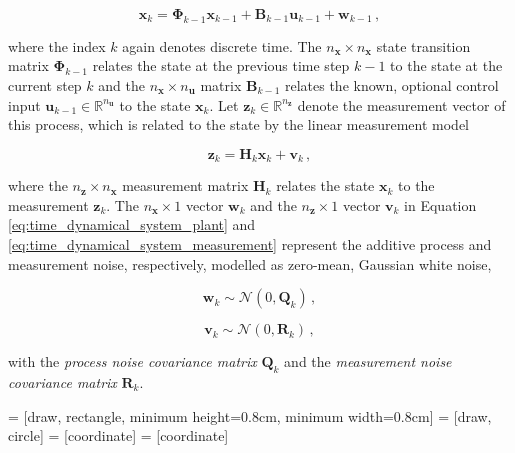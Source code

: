 \begin{equation}\label{eq:time_dynamical_system_plant}
  \bm{x}_k = \bm{\Phi}_{k-1}\bm{x}_{k-1}+\bm{B}_{k-1}\bm{u}_{k-1}+\bm{w}_{k-1}\,,
\end{equation}

\noindent
where the index $k$ again denotes discrete time. The $n_{\bm{x}} \times n_{\bm{x}}$ state transition matrix $\bm{\Phi}_{k-1}$ relates the state at the previous time step $k-1$ to the state at the current step $k$ and the $n_{\bm{x}} \times n_{\bm{u}}$ matrix $\bm{B}_{k-1}$ relates the known, optional control input $\bm{u}_{k-1} \in \mathbb{R}^{n_{\bm{u}}}$ to the state $\bm{x}_k$. Let $\bm{z}_k \in \mathbb{R}^{n_{\bm{z}}}$ denote the measurement vector of this process, which is related to the state by the linear measurement model

\begin{equation}\label{eq:time_dynamical_system_measurement}
  \bm{z}_k = \bm{H}_{k}\bm{x}_{k}+\bm{v}_{k}\,,
\end{equation}

\noindent
 where the $n_{\bm{z}} \times n_{\bm{x}}$ measurement matrix $\bm{H}_{k}$ relates the state $\bm{x}_k$ to the measurement $\bm{z}_k$. The $n_{\bm{x}}\times1$ vector $\bm{w}_k$ and the $n_{\bm{z}}\times1$ vector $\bm{v}_k$ in Equation \ref{eq:time_dynamical_system_plant} and \ref{eq:time_dynamical_system_measurement} represent the additive process and measurement noise, respectively, modelled as zero-mean, Gaussian white noise,

\begin{equation}\label{eq:process_noise}
  \bm{w}_{k} \sim \mathcal{N}(0,\bm{Q}_k)\,,
\end{equation}

\begin{equation}\label{eq:measurement_noise}
  \bm{v}_{k} \sim \mathcal{N}(0,\bm{R}_k)\,,
\end{equation}
 
\noindent
with the \emph{process noise covariance matrix} $\bm{Q}_k$ and the \emph{measurement noise covariance matrix} $\bm{R}_k$.

 = [draw, rectangle, minimum height=0.8cm, minimum width=0.8cm]
 = [draw, circle]
 = [coordinate]
 = [coordinate]

